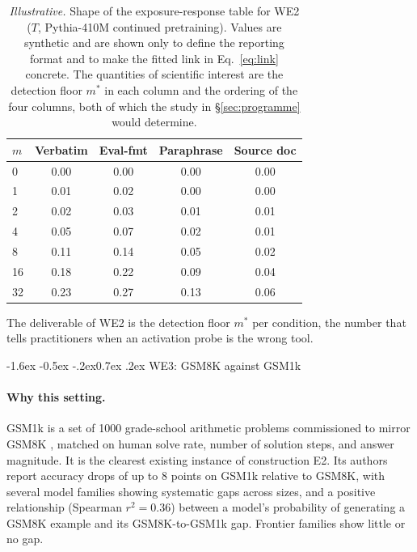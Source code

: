 \documentclass[10pt,twocolumn,letterpaper]{article}
\makeatletter
\renewcommand\subsection{\@startsection{subsection}{2}{\z@}%
  {-1.6ex \@plus -0.5ex \@minus -.2ex}{0.7ex \@plus .2ex}%
  {\normalfont\normalsize\bfseries}}
\newcommand{\illus}{\textit{Illustrative.}}
\makeatother
\begin{document}
\begin{table}[t]
\small
\setlength{\tabcolsep}{4pt}
\begin{tabular}{@{}lcccc@{}}
\toprule
$m$ & Verbatim & Eval-fmt & Paraphrase & Source doc \\
\midrule
0  & 0.00 & 0.00 & 0.00 & 0.00 \\
1  & 0.01 & 0.02 & 0.00 & 0.00 \\
2  & 0.02 & 0.03 & 0.01 & 0.01 \\
4  & 0.05 & 0.07 & 0.02 & 0.01 \\
8  & 0.11 & 0.14 & 0.05 & 0.02 \\
16 & 0.18 & 0.22 & 0.09 & 0.04 \\
32 & 0.23 & 0.27 & 0.13 & 0.06 \\
\bottomrule
\end{tabular}
\caption{\illus{} Shape of the exposure-response table for WE2 ($T$, Pythia-410M continued pretraining). Values are synthetic and are shown only to define the reporting format and to make the fitted link in Eq.~\eqref{eq:link} concrete. The quantities of scientific interest are the detection floor $m^{*}$ in each column and the ordering of the four columns, both of which the study in \S\ref{sec:programme} would determine.}
\label{tab:we2}
\end{table}

The deliverable of WE2 is the detection floor $m^{*}$ per condition, the number that tells practitioners when an activation probe is the wrong tool.

\subsection{WE3: GSM8K against GSM1k}
\label{sec:we3}

\paragraph{Why this setting.} GSM1k \cite{zhang2024gsm1k} is a set of 1000 grade-school arithmetic problems commissioned to mirror GSM8K \cite{cobbe2021gsm8k}, matched on human solve rate, number of solution steps, and answer magnitude. It is the clearest existing instance of construction E2. Its authors report accuracy drops of up to 8 points on GSM1k relative to GSM8K, with several model families showing systematic gaps across sizes, and a positive relationship (Spearman $r^2=0.36$) between a model's probability of generating a GSM8K example and its GSM8K-to-GSM1k gap. Frontier families show little or no gap.
\end{document}

